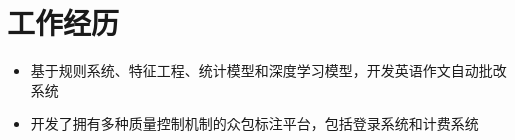 \section{工作经历}
\begin{itemize}
  \item 基于规则系统、特征工程、统计模型和深度学习模型，开发英语作文自动批改系统
  \item 开发了拥有多种质量控制机制的众包标注平台，包括登录系统和计费系统
\end{itemize}


